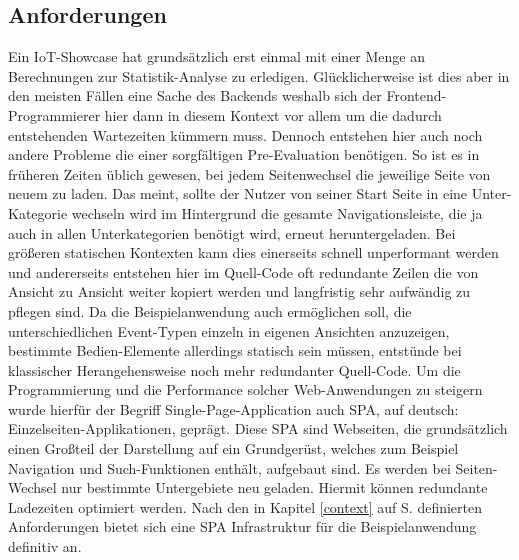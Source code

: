 \documentclass[12pt,a4paper,oneside, 
liststotoc, 					%
bibtotoc,						%
titlepage, 						%
headsepline, 					%
BCOR6mm,						%
openany,							%
]{scrreprt}
\begin{document}
  \subsection{Anforderungen}\label{ressourcen_infrastructure_dependencies}
  Ein IoT-Showcase hat grundsätzlich erst einmal mit einer Menge an Berechnungen zur Statistik-Analyse zu erledigen. Glücklicherweise ist dies aber in den meisten Fällen eine Sache des Backends weshalb sich der Frontend-Programmierer hier dann in diesem Kontext vor allem um die dadurch entstehenden Wartezeiten kümmern muss. Dennoch entstehen hier auch noch andere Probleme die einer sorgfältigen Pre-Evaluation benötigen. So ist es in früheren Zeiten üblich gewesen, bei jedem Seitenwechsel die jeweilige Seite von neuem zu laden. Das meint, sollte der Nutzer von seiner Start Seite in eine Unter-Kategorie wechseln wird im Hintergrund die gesamte Navigationsleiste, die ja auch in allen Unterkategorien benötigt wird, erneut heruntergeladen. Bei größeren statischen Kontexten kann dies einerseits schnell unperformant werden und andererseits entstehen hier im Quell-Code oft redundante Zeilen die von Ansicht zu Ansicht weiter kopiert werden und langfristig sehr aufwändig zu pflegen sind. Da die Beispielanwendung auch ermöglichen soll, die unterschiedlichen Event-Typen einzeln in eigenen Ansichten anzuzeigen, bestimmte Bedien-Elemente allerdings statisch sein müssen, entstünde bei klassischer Herangehensweise noch mehr redundanter Quell-Code. Um die Programmierung und die Performance solcher Web-Anwendungen zu steigern wurde hierfür der Begriff Single-Page-Application auch SPA, auf deutsch: Einzelseiten-Applikationen, geprägt. Diese SPA sind Webseiten, die grundsätzlich einen Großteil der Darstellung auf ein Grundgerüst, welches zum Beispiel Navigation und Such-Funktionen enthält, aufgebaut sind. Es werden bei Seiten-Wechsel nur bestimmte Untergebiete neu geladen. Hiermit können redundante Ladezeiten optimiert werden. Nach den in Kapitel \ref{context} auf S.\pageref{context_dependencies} definierten Anforderungen bietet sich eine SPA Infrastruktur für die Beispielanwendung definitiv an.
\end{document}

